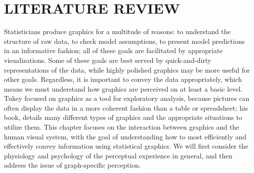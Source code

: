 \documentclass[11pt]{isuthesis}\usepackage[]{graphicx}\usepackage[]{color}
\begin{document}

% 
\tableofcontents
{} \cleardoublepage {}
{}
\listoftables
\cleardoublepage {} {}
\listoffigures
\cleardoublepage {}

\cleardoublepage {}

\newpage
{}


\graphicspath{{Figure/LitReview/}{Images/LitReview/}}
\renewcommand{\floatpagefraction}{.99}



\chapter{LITERATURE REVIEW}\label{litreview}

Statisticians produce graphics for a multitude of reasons: to understand the structure of raw data, to check model assumptions, to present model predictions in an informative fashion; all of these goals are facilitated by appropriate visualizations. Some of these goals are best served by quick-and-dirty representations of the data, while highly polished graphics may be more useful for other goals. Regardless, it is important to convey the data appropriately, which means we must understand how graphics are perceived on at least a basic level. Tukey focused on graphics as a tool for exploratory analysis, because pictures can often display the data in a more coherent fashion than a table or spreadsheet; his book, \citet{eda} details many different types of graphics and the appropriate situations to utilize them. This chapter focuses on the interaction between graphics and the human visual system, with the goal of understanding how  to most efficiently and effectively convey information using statistical graphics. We will first consider the physiology and psychology of the perceptual experience in general, and then address the issue of graph-specific perception. 
\end{document}
